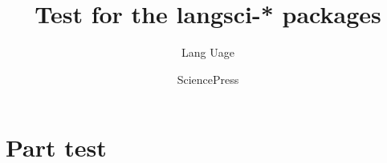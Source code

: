 \documentclass[output=book
  ,colorlinks
  ,showindex
  ,draftmode
  ,openreview
  ,nobabel
  ,booklanguage=italian
  ,oldstylenumbers
  ,multiauthors
  ,biblatex
  ]{langscibook}
\title{Test for the langsci-* packages}
\author{Lang Uage\and Science\lastand Press}
\begin{document}
\renewcommand{\lsImpressumExtra}{Manuscript submitted in fulfillment of entering the Galactical Hall of Fame.}
\maketitle
\tableofcontents
\mainmatter


\part{Part test}
% 
% 
% 
% 
% 
% 
% 
% 
% 
% 
%
%
% 
% 
% 
% 
% 
%
% 
% 
% 
% 
% 
\end{document}
